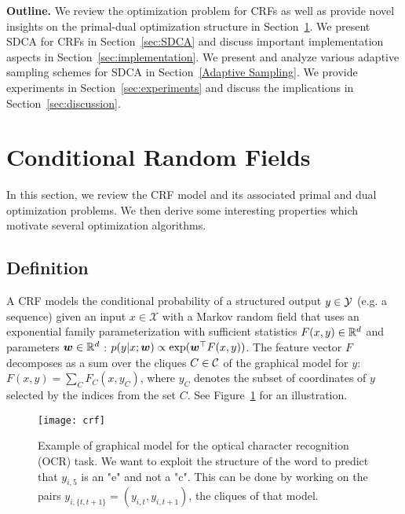 \textbf{Outline.}
We review the optimization problem for CRFs as well as provide novel insights on the primal-dual optimization structure in Section~\ref{sec:CRF}.
We present SDCA for CRFs in Section~\ref{sec:SDCA} and discuss important implementation aspects in Section~\ref{sec:implementation}.
We present and analyze various adaptive sampling schemes for SDCA in Section~\ref{Adaptive Sampling}.
We provide experiments in Section~\ref{sec:experiments} and discuss the implications in Section~\ref{sec:discussion}.


\section{Conditional Random Fields} \label{sec:CRF}
In this section, we review the CRF model and its associated primal and dual optimization problems.
We then derive some interesting properties which motivate several optimization algorithms.

\subsection{Definition}
A CRF models the conditional probability of a structured output $y \in {\mathcal Y}$ (e.g. a sequence) given an input $x\in \mathcal X$ with a Markov random field that uses an exponential family parameterization with sufficient statistics $F(x,y) \in \mathbb{R}^d$ and parameters $\boldsymbol{w} \in \mathbb{R}^d$ : $p(y | x ; \boldsymbol{w}) \propto \exp(\boldsymbol{w}^{\top}F(x, y))$. The feature vector $F$ decomposes as a sum over the cliques $C \in {\mathcal C}$ of the graphical model for $y$: $F(x, y) = \sum_C F_C(x, y_C)$, where $y_C$ denotes the subset of coordinates of $y$ selected by the indices from the set $C$. See Figure~\ref{crf example} for an illustration.


\begin{figure}
	\centering \texttt{[image: crf]}
	\caption[Example of graphical model for the optical character recognition (OCR) task]{
		Example of graphical model for the optical character recognition (OCR) task.
		We want to exploit the structure of the word to predict that $y_{i,5}$ is an "e" and not a "c".
		This can be done by working on the pairs $y_{i,\{t, t+1\} } = (y_{i, t}, y_{i, t+1})$, the cliques of that model.
		}
		\label{crf example}
\end{figure}

